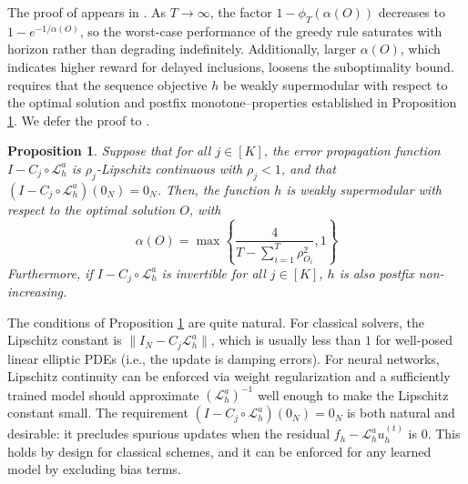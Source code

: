 \documentclass{article} %
\newtheorem{proposition}[theorem]{Proposition}
\begin{document}
The proof of  appears in . As $T \to \infty$, the factor $1 - \phi_T(\alpha(O))$ decreases to $1 - e^{-1/\alpha(O)}$, so the worst-case performance of the greedy rule saturates with horizon rather than degrading indefinitely. Additionally, larger $\alpha(O)$, which indicates higher reward for delayed inclusions, loosens the suboptimality bound.  
 requires that the sequence objective $h$ be weakly supermodular with respect to the optimal solution and postfix monotone--properties established in Proposition \ref{th:weaklyalphasupermodular}. We defer the proof to .

\begin{proposition} \label{th:weaklyalphasupermodular}
    Suppose that for all $j \in [K]$, the error propagation function $I - C_j \circ \mathcal{L}_h^a$ is $\rho_j$-Lipschitz continuous with $\rho_j < 1$, and that $(I - C_j \circ \mathcal{L}_h^a) (0_N) = 0_N$. Then, the function $h$ is weakly supermodular with respect to the optimal solution $O$, with $$\alpha(O) = \max\left\{\frac{4}{T - \sum_{i = 1}^{T} \rho_{O_i}^2} , 1\right\}$$Furthermore, if $I - C_j \circ \mathcal{L}_h^a$ is invertible for all $j \in [K]$, $h$ is also postfix non-increasing.
\end{proposition}
The conditions of Proposition \ref{th:weaklyalphasupermodular} are quite natural. For classical solvers, the Lipschitz constant is $\|I_N - C_j \mathcal{L}^a_h\|$, which is usually less than $1$
for well-posed linear elliptic PDEs (i.e., the update is damping errors). 
For neural networks, Lipschitz continuity can be enforced via weight regularization \citep{gouk2021regularisation} and a sufficiently trained model should approximate $(\mathcal{L}^a_h)^{-1}$ well enough to make the Lipschitz constant small.
The requirement $(I - C_j \circ \mathcal{L}_h^a) (0_N) = 0_N$
is both natural and desirable: it precludes spurious updates when the residual $f_h - \mathcal{L}^a_h u_h^{(t)}$ is $0$. This holds by design for classical schemes, and it can be enforced for any learned model by excluding bias terms.
\end{document}
